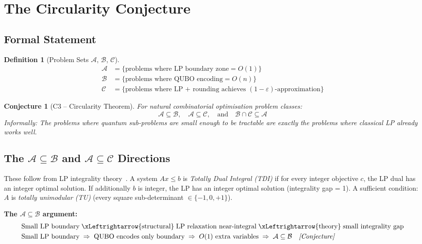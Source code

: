 \documentclass[11pt]{article}
\newtheorem{conjecture}[theorem]{Conjecture}
\newtheorem{definition}[theorem]{Definition}
\theoremstyle{remark}
\newcommand{\calA}{\mathcal{A}}
\newcommand{\calB}{\mathcal{B}}
\newcommand{\calC}{\mathcal{C}}
\begin{document}
\section{The Circularity Conjecture}
\label{sec:circularity}

\subsection{Formal Statement}

\begin{definition}[Problem Sets $\calA$, $\calB$, $\calC$]
\label{def:ABC}
\begin{align}
  \calA &= \{\text{problems where LP boundary zone} = O(1)\} \\
  \calB &= \{\text{problems where QUBO encoding} = O(n)\} \\
  \calC &= \{\text{problems where LP + rounding achieves }
              (1-\varepsilon)\text{-approximation}\}
\end{align}
\end{definition}

\begin{conjecture}[C3 -- Circularity Theorem]
\label{conj:C3}
For natural combinatorial optimisation problem classes:
\begin{equation}
  \calA \subseteq \calB, \quad \calA \subseteq \calC,
  \quad\text{and}\quad \calB \cap \calC \subseteq \calA
\end{equation}
\emph{Informally:} The problems where quantum sub-problems are small enough
to be tractable are exactly the problems where classical LP already works well.
\end{conjecture}

\subsection{The $\calA \subseteq \calB$ and $\calA \subseteq \calC$ Directions}

These follow from LP integrality theory~\cite{schrijver1986}.
A system $Ax \leq b$ is \emph{Totally Dual Integral (TDI)} if for every
integer objective $c$, the LP dual has an integer optimal solution.
If additionally $b$ is integer, the LP has an integer optimal solution
(integrality gap = 1). A sufficient condition: $A$ is \emph{totally
unimodular (TU)} (every square sub-determinant $\in \{-1,0,+1\}$).

\noindent\textbf{The $\calA \subseteq \calB$ argument:}
\begin{align}
  &\text{Small LP boundary}
    \;\xLeftrightarrow{\text{structural}}\;
    \text{LP relaxation near-integral}
    \;\xLeftrightarrow{\text{theory}}\;
    \text{small integrality gap} \notag\\
  &\text{Small LP boundary}
    \;\Rightarrow\;
    \text{QUBO encodes only boundary}
    \;\Rightarrow\;
    O(1)\text{ extra variables}
    \;\Rightarrow\;
    \calA \subseteq \calB \quad\textit{[Conjecture]}
\end{align}
\end{document}
